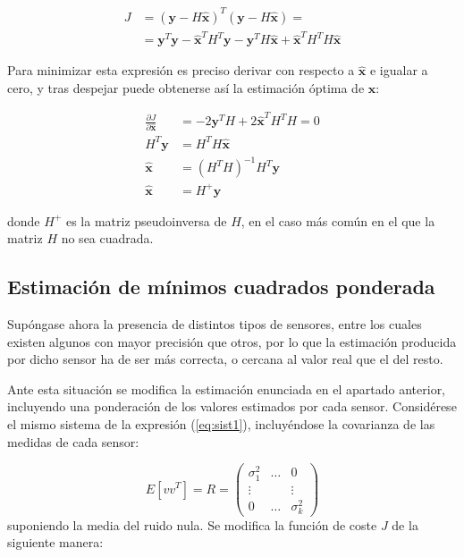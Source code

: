 \begin{equation}
\begin{split}
	J &= (\boldsymbol{y} - H\boldsymbol{\hat{x}})^T (\boldsymbol{y} - H\boldsymbol{\hat{x}}) = \\
	&= \boldsymbol{y}^T \boldsymbol{y} - \boldsymbol{\hat{x}}^T H^T \boldsymbol{y} - \boldsymbol{y}^T H\boldsymbol{\hat{x}} + \boldsymbol{\hat{x}}^T H^T H\boldsymbol{\hat{x}}
\end{split}
\end{equation}

Para minimizar esta expresión es preciso derivar con respecto a $ \boldsymbol{\hat{x}} $ e igualar a cero, y tras despejar puede obtenerse así la estimación óptima de $ \boldsymbol{x} $:

\begin{equation}
\begin{split}
	\frac{\partial J}{\partial \boldsymbol{\hat{x}}} &= -2 \boldsymbol{y}^T H + 2 \boldsymbol{\hat{x}}^T H^T H = 0 \\
	H^T\boldsymbol{y} &= H^T H \boldsymbol{\hat{x}} \\
	\boldsymbol{\hat{x}} &= (H^T H)^{-1}H^T\boldsymbol{y} \\
	\boldsymbol{\hat{x}} &= H^{+}\boldsymbol{y}
\end{split}
\end{equation}

\noindent
donde $ H^{+} $ es la matriz pseudoinversa de $ H $, en el caso más común en el que la matriz $H$ no sea cuadrada. \par 

\subsection{Estimación de mínimos cuadrados ponderada}

Supóngase ahora la presencia de distintos tipos de sensores, entre los cuales existen algunos con mayor precisión que otros, por lo que la estimación producida por dicho sensor ha de ser más correcta, o cercana al valor real que el del resto. \par 

Ante esta situación se modifica la estimación enunciada en el apartado anterior, incluyendo una ponderación de los valores estimados por cada sensor. Considérese el mismo sistema de la expresión (\ref{eq:sist1}), incluyéndose la covarianza de las medidas de cada sensor:

\[
	E[v v^T] = R = \begin{pmatrix}
		\sigma_1^2 & \ldots & 0 \\
		\vdots &  & \vdots \\
		0 & \ldots & \sigma_k^2
	\end{pmatrix} 
\]
\noindent
suponiendo la media del ruido nula. Se modifica la función de coste $J$ de la siguiente manera:

